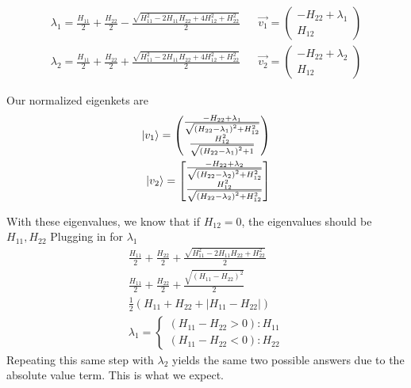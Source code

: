 \documentclass[]{article}
\begin{document}
\[
\begin{align}
 \lambda_{1}=\frac{H_{11}}{2} + \frac{H_{22}}{2} - \frac{\sqrt{H_{11}^{2} - 2 H_{11} H_{22} + 4 H_{12}^{2} + H_{22}^{2}}}{2}  &  & \vec{v_{1}}=\begin{pmatrix}
-H_{22}+\lambda_{1} \\
H_{12}
\end{pmatrix}\\
\lambda_{2} = \frac{H_{11}}{2} + \frac{H_{22}}{2} + \frac{\sqrt{H_{11}^{2} - 2 H_{11} H_{22} + 4 H_{12}^{2} + H_{22}^{2}}}{2} &  & \vec{v_{2}}=\begin{pmatrix}
-H_{22}+\lambda_{2} \\
H_{12}
\end{pmatrix}
\end{align}
\]

Our normalized eigenkets are \[
\begin{align}
\ket{v_{1}}  = \begin{pmatrix}\frac{- H_{22} + \lambda_{1}}{\sqrt{\left(H_{22} - \lambda_{1}\right)^{2} + H_{12}^{2}}}\\\frac{H_{12}^{2}}{\sqrt{\left(H_{22} - \lambda_{1}\right)^{2} + 1}}\end{pmatrix} \\
\ket{v_{2}}  = \left[\begin{matrix}\frac{- H_{22} + \lambda_{2}}{\sqrt{\left(H_{22} - \lambda_{2}\right)^{2} + H_{12}^{2}}}\\ \frac{H_{12}^{2}}{\sqrt{\left(H_{22} - \lambda_{2}\right)^{2} + H_{12}^{2}}}\end{matrix}\right]
\end{align} 
\]

With these eigenvalues, we know that if \(H_{12}=0\), the eigenvalues
should be \(H_{11},H_{22}\) Plugging in for \(\lambda_{1}\) \[
\begin{align}
\frac{H_{11}}{2} + \frac{H_{22}}{2} + \frac{\sqrt{H_{11}^{2} - 2 H_{11} H_{22} + H_{22}^{2}}}{2} \\
\frac{H_{11}}{2} + \frac{H_{22}}{2}+{\frac{\sqrt{ \left( H_{11}-H_{22} \right) ^{2} }}{2}} \\
\frac{1}{2}\left( H_{11}+H_{22}+\left| H_{11}-H_{22} \right|  \right)  \\
\lambda_{1} = \begin{cases} \left( H_{11}-H_{22}>0 \right) :
H_{11} \\
\left( H_{11}-H_{22}<0 \right):H_{22}
\end{cases}
\end{align}
\] Repeating this same step with \(\lambda_{2}\) yields the same two
possible answers due to the absolute value term. This is what we expect.
\end{document}
